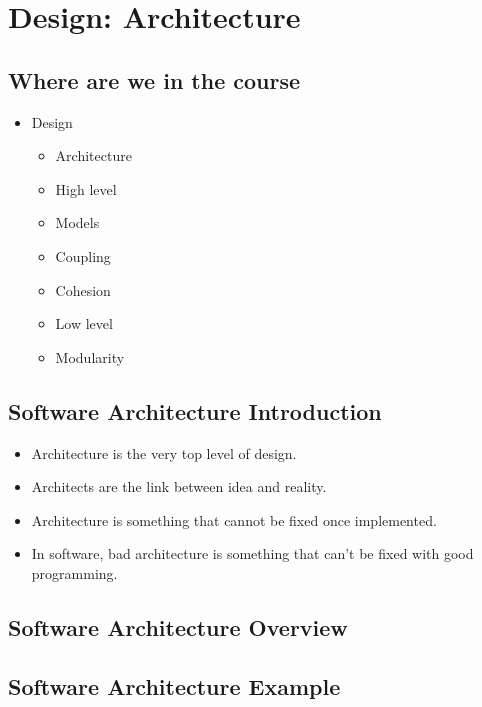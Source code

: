 \section{Design: Architecture}

    \subsection{Where are we in the course}

        \begin{itemize}
            \item Design
            \begin{itemize}
                \item Architecture
                \item High level
                \item Models
                \item Coupling
                \item Cohesion
                \item Low level
                \item Modularity
            \end{itemize}
        \end{itemize}

    \subsection{Software Architecture Introduction}

        \begin{itemize}
            \item Architecture is the very top level of design.
            \item Architects are the link between idea and reality.
            \item Architecture is something that cannot be fixed once implemented.
            \item In software, bad architecture is something that can't be fixed with good programming.
        \end{itemize}

    \subsection{Software Architecture Overview}

    \subsection{Software Architecture Example}


    


